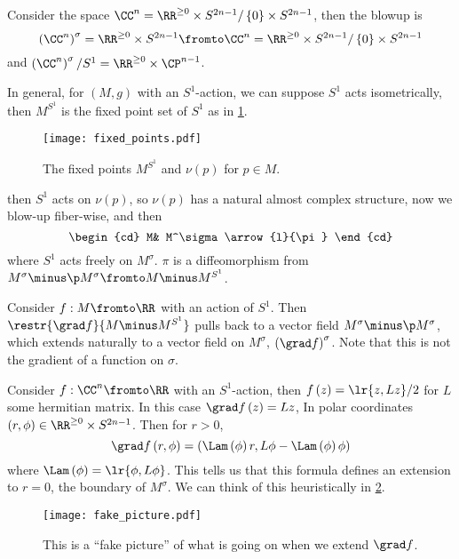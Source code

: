 \documentclass{amsart}
\begin{document}
\begin{exm}
Consider the space $\CC^n =\RR^{\geq 0} \times S^{2n-1} / \left\{ 0 \right\} \times S^{2n-1}$, 
then the blowup is
\begin{equation}
\left( \CC^n \right)^\sigma = \RR^{\geq 0} \times S^{2n-1} \fromto
\CC^n = \RR^{\geq 0} \times S^{2n-1} / \left\{ 0 \right\} \times S^{2n-1}
\end{equation}
and $\left( \CC^n \right)^\sigma / S^1 = \RR^{\geq 0} \times \CP^{n-1}$.
\end{exm}

\begin{exm}
In general, for $\left( M , g \right)$ with an $S^1$-action, 
we can suppose $S^1$ acts isometrically, 
then $M^{S^1}$ is the fixed point set of $S^1$ as in 
\cref{fig:fixed_points}.
\begin{figure}
\texttt{[image: fixed\_points.pdf]}
\caption{The fixed points $M^{S^1}$ and $\nu\left( p \right)$ for $p\in M$.}
\label{fig:fixed_points}
\end{figure}
then $S^1$ acts on $\nu\left( p \right)$, so
$\nu\left( p \right)$ has a natural almost complex
structure, now we blow-up fiber-wise, and then
\begin{equation}
\begin{cd}
M&
M^\sigma \arrow{l}{\pi}
\end{cd}
\end{equation}
where $S^1$ acts freely on $M^\sigma$.
$\pi$ is a diffeomorphism from 
$M^\sigma\minus \p M^\sigma \fromto M\minus M^{S^1}$.
\end{exm}

\begin{fact}
Consider $f:M\fromto \RR$ with an action of $S^1$. Then
$\restr{\grad f}{M\minus M^{S^1}}$ pulls back to a vector field $M^\sigma \minus \p M^\sigma$,
which extends naturally to a vector field on $M^\sigma$, 
$\left( \grad f \right)^\sigma$. 
Note that this is not the gradient of a function on $\sigma$.
\end{fact}

\begin{exm}
Consider $f:\CC^n\fromto \RR$ with an $S^1$-action, then
$f\left( z \right) = \lr{z , Lz}/2$ for $L$ some hermitian matrix.
In this case $\grad f\left( z \right) = Lz$, 
In polar coordinates $\left( r , \phi \right) \in \RR^{\geq 0} \times S^{2n-1}$.
Then for $r > 0$, 
\begin{equation}
\grad f\left( r , \phi \right) = 
\left( \Lam\left( \phi \right) r , L\phi - \Lam\left( \phi \right) \phi \right)
\end{equation}
where $\Lam\left( \phi \right) = \lr{\phi , L\phi}$.
This tells us that this formula defines an extension to $r =0$, 
the boundary of $M^\sigma$.
We can think of this heuristically in \cref{fig:fake_picture}.
\begin{figure}
\texttt{[image: fake\_picture.pdf]}
\caption{This is a ``fake picture'' of what is going on when
we extend $\grad f$.}
\label{fig:fake_picture}
\end{figure}
\end{exm}
\end{document}
